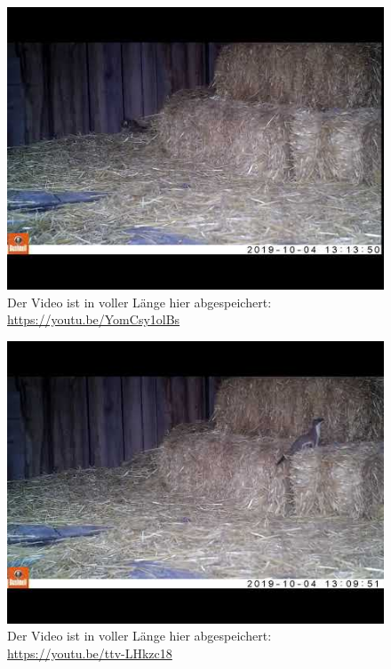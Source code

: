 \documentclass[
  oneside]{scrbook}
\begin{document}
\begin{figure}[hbt!] \centering \includegraphics{images/youtube/YomCsy1olBs.jpg} \caption{Der Video ist in voller Länge hier abgespeichert: \url{https://youtu.be/YomCsy1olBs}} \end{figure}\begin{figure}[hbt!] \centering \includegraphics{images/youtube/ttv-LHkzc18.jpg} \caption{Der Video ist in voller Länge hier abgespeichert: \url{https://youtu.be/ttv-LHkzc18}} \end{figure}
\end{document}
